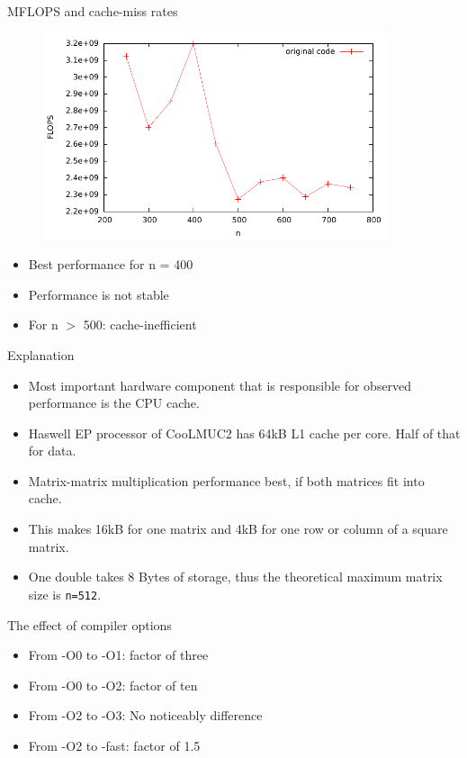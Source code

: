 \begin{frame}{MFLOPS and cache-miss rates}
\begin{figure}[h]
  \begin{center}
    \includegraphics[width=0.9\textwidth]{../graphics/graph_unblocked.pdf}
  \end{center}
\end{figure}
\begin{itemize}
\item Best performance for n = 400
\item Performance is not stable
\item For n $>$ 500: cache-inefficient
\end{itemize}
\end{frame}

\begin{frame}{Explanation}
\begin{itemize}
\item Most important hardware component that is responsible for observed performance is the CPU cache.
\item Haswell EP processor of CooLMUC2 has 64kB L1 cache per core. Half of that for data.
\item Matrix-matrix multiplication performance best, if both matrices fit into cache.
\item This makes 16kB for one matrix and 4kB for one row or column of a square matrix.
\item One double takes 8 Bytes of storage, thus the theoretical maximum matrix size is \texttt{n=512}.
\end{itemize}
\end{frame}

\begin{frame}{The effect of compiler options}
\begin{itemize}
\item From -O0 to -O1: factor of three
\item From -O0 to -O2: factor of ten
\item From -O2 to -O3: No noticeably difference
\item From -O2 to -fast: factor of 1.5
\end{itemize}
\end{frame}

